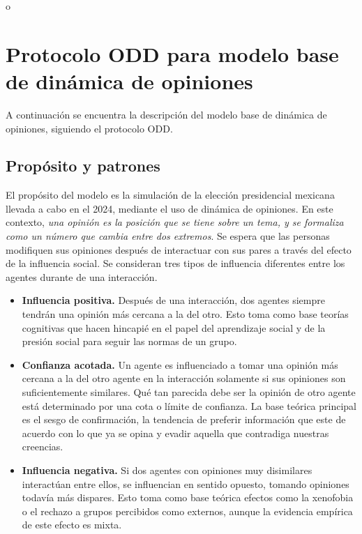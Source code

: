 o \documentclass[11pt, letterpaper]{article}
\begin{document}
\section{Protocolo ODD para modelo base de dinámica de
opiniones}\label{protocolo-odd-para-modelo-base-de-dinuxe1mica-de-opiniones}

A continuación se encuentra la descripción del modelo base de dinámica
de opiniones, siguiendo el protocolo ODD.

\subsection{Propósito y patrones}\label{propuxf3sito-y-patrones}

El propósito del modelo es la simulación de la elección presidencial
mexicana llevada a cabo en el 2024, mediante el uso de dinámica de
opiniones. En este contexto, \emph{una opinión es la posición que se
tiene sobre un tema, y se formaliza como un número que cambia entre dos
extremos}. Se espera que las personas modifiquen sus opiniones después
de interactuar con sus pares a través del efecto de la influencia
social. Se consideran tres tipos de influencia diferentes entre los
agentes durante de una interacción.

\begin{itemize}
\item
  \textbf{Influencia positiva.} Después de una interacción, dos agentes
  siempre tendrán una opinión más cercana a la del otro. Esto toma como
  base teorías cognitivas que hacen hincapié en el papel del aprendizaje
  social y de la presión social para seguir las normas de un grupo.
\item
  \textbf{Confianza acotada.} Un agente es influenciado a tomar una
  opinión más cercana a la del otro agente en la interacción solamente
  si sus opiniones son suficientemente similares. Qué tan parecida debe
  ser la opinión de otro agente está determinado por una cota o límite
  de confianza. La base teórica principal es el sesgo de confirmación,
  la tendencia de preferir información que este de acuerdo con lo que ya
  se opina y evadir aquella que contradiga nuestras creencias.
\item
  \textbf{Influencia negativa.} Si dos agentes con opiniones muy
  disimilares interactúan entre ellos, se influencian en sentido
  opuesto, tomando opiniones todavía más dispares. Esto toma como base
  teórica efectos como la xenofobia o el rechazo a grupos percibidos
  como externos, aunque la evidencia empírica de este efecto es mixta.
\end{itemize}
\end{document}
